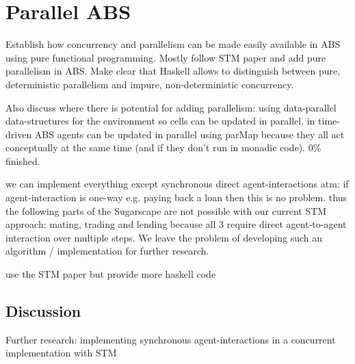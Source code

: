 \chapter{Parallel ABS}
\label{ch:parallel_abs}

Establish how concurrency and parallelism can be made easily available in ABS using pure functional programming. Mostly follow STM paper and add pure parallelism in ABS. Make clear that Haskell allows to distinguish between pure, deterministic parallelism and impure, non-deterministic concurrency.

Also discuss where there is potential for adding parallelism: using data-parallel data-structures for the environment so cells can be updated in parallel, in time-driven ABS agents can be updated in parallel using parMap because they all act conceptually at the same time (and if they don't run in monadic code). 0\% finished.

we can implement everything except synchronous direct agent-interactions atm: if agent-interaction is one-way e.g. paying back a loan then this is no problem. thus the following parts of the Sugarscape are not possible with our current STM approach: mating, trading and lending  because all 3 require direct agent-to-agent interaction over multiple steps. We leave the problem of developing such an algorithm / implementation for further research.

use the STM paper but provide more haskell code

\section{Discussion}
Further research: implementing synchronous agent-interactions in a concurrent implementation with STM